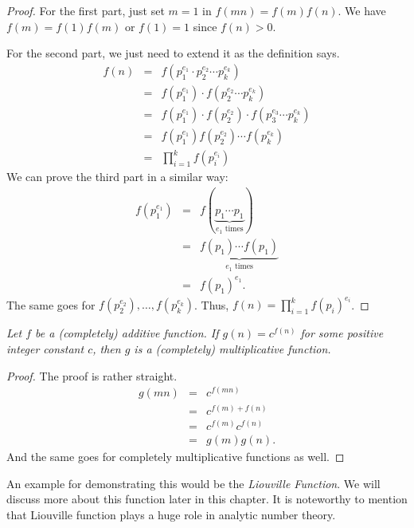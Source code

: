 \documentclass[12pt]{subfile}
\begin{document}
		\begin{proof}
			For the first part, just set $m=1$ in $f(mn)=f(m)f(n)$. We have $f(m)=f(1)f(m)$ or $f(1)=1$ since $f(n)>0$.

			For the second part, we just need to extend it as the definition says.
				\begin{eqnarray*}
					f(n) & = & f(p_1^{e_1}\cdot p_2^{e_2}\cdots p_k^{e_k})\\
						 & = & f(p_1^{e_1})\cdot f(p_2^{e_2}\cdots p_k^{e_k})\\
						 & = & f(p_1^{e_1})\cdot  f(p_2^{e_2}) \cdot f(p_3^{e_3}\cdots p_k^{e_k})\\
						 & = & f(p_1^{e_1})f(p_2^{e_2})\cdots f(p_k^{e_k})\\
						 & = & \prod_{i=1}^{k}f(p_i^{e_i})
				\end{eqnarray*}
			We can prove the third part in a similar way:
				\begin{eqnarray*}
					f(p_1^{e_1}) & = & f(\underbrace{p_1\cdots p_1}_{e_1 \text{ times}})\\
							 & = & \underbrace{f(p_1)\cdots f(p_1)}_{e_1\text{ times}}\\
							 & = & f(p_1)^{e_1}.
				\end{eqnarray*}
			The same goes for $f(p_2^{e_2}),\ldots, f(p_k^{e_k})$. Thus, $f(n)=\prod_{i=1}^{k}f(p_i)^{e_i}$.
		\end{proof}

		\begin{proposition}\slshape\label{prop:addtomul}
			Let $f$ be a (completely) additive function. If $g(n)=c^{f(n)}$ for some positive integer constant $c$, then $g$ is a (completely) multiplicative function.
		\end{proposition}

		\begin{proof}
			The proof is rather straight.
				\begin{eqnarray*}
					g(mn) & = & c^{f(mn)}\\
						  & = & c^{f(m)+f(n)}\\
						  & = & c^{f(m)}c^{f(n)}\\
						  & = & g(m)g(n).
				\end{eqnarray*}
			And the same goes for completely multiplicative functions as well.
		\end{proof}
	An example for demonstrating this would be the \textit{Liouville Function}. We will discuss more about this function later in this chapter. It is noteworthy to mention that Liouville function plays a huge role in analytic number theory.
\end{document}
